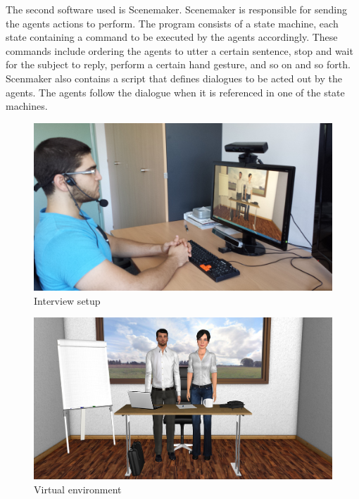 \documentclass[12pt, a4paper, fleqn]{memoir}%
\begin{document}
The second software used is Scenemaker. Scenemaker is responsible for sending the agents actions to perform. The program consists of a state machine, each state containing a command to be executed by the agents accordingly. These commands include ordering the agents to utter a certain sentence, stop and wait for the subject to reply, perform a certain hand gesture, and so on and so forth. Scenmaker also contains a script that defines dialogues to be acted out by the agents. The agents follow the dialogue when it is referenced in one of the state machines.

\begin{figure}[h!]
    \centering
    \includegraphics[width=1\textwidth]{setup}
    \caption{Interview setup}
    \label{fig:setup_img}
\end{figure}

\begin{figure}[h!]
    \centering
    \includegraphics[width=1\textwidth]{agents}
    \caption{Virtual environment}
    \label{fig:agents_img}
\end{figure}

\end{document}
